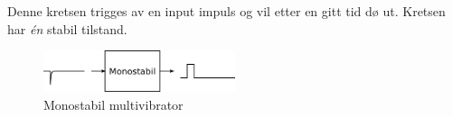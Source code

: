 Denne kretsen trigges av en input impuls og vil etter en gitt tid dø ut.
Kretsen har \emph{én} stabil tilstand.

\begin{figure}[H]
  \centering
  \includegraphics[width=0.5\textwidth]{./img/monostabil}
  \caption{Monostabil multivibrator}
\end{figure}
